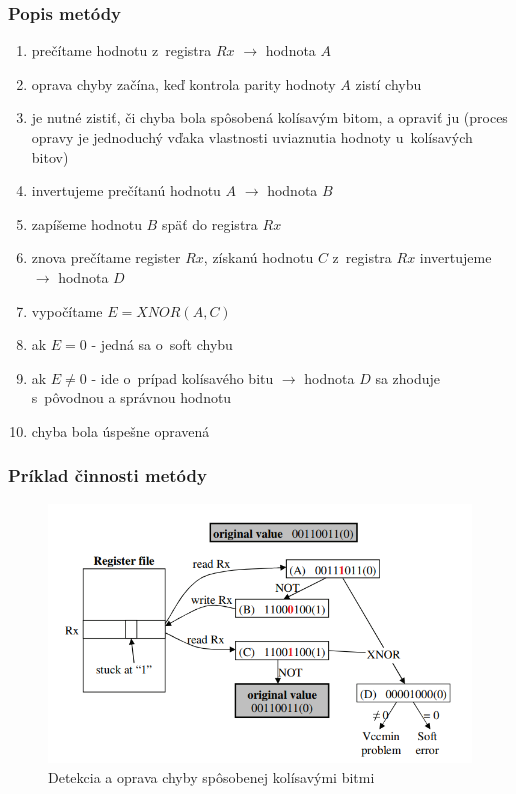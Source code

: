 \documentclass{beamer}
\begin{document}
\begin{frame}\frametitle{Popis metódy}
\begin{enumerate}
	\item prečítame hodnotu z~registra $Rx$ $\rightarrow$ hodnota $A$
	\item oprava chyby začína, keď kontrola parity hodnoty $A$ zistí chybu
	\item je nutné zistiť, či chyba bola spôsobená kolísavým bitom, a opraviť ju 	(proces opravy je jednoduchý vďaka vlastnosti uviaznutia hodnoty u~kolísavých bitov)
	\item invertujeme prečítanú hodnotu $A$ $\rightarrow$ hodnota $B$
	\item zapíšeme hodnotu $B$ späť do registra $Rx$
	\item znova prečítame register $Rx$, získanú hodnotu $C$  z~registra $Rx$ invertujeme $\rightarrow$ hodnota $D$
	\item vypočítame $E= XNOR(A,C)$
	\item ak $E = 0$ \-- jedná sa o~soft chybu
	\item ak $E \neq 0$ \--  ide o~prípad kolísavého bitu $\rightarrow$ hodnota $D$ sa zhoduje s~pôvodnou a správnou hodnotu
	\item chyba bola úspešne opravená
\end{enumerate}
\end{frame}

\begin{frame}\frametitle{Príklad činnosti metódy}
\begin{center}
	\begin{figure}
		\includegraphics[width=\textwidth,height=0.7\textheight,keepaspectratio]{example.png}
		\caption{Detekcia a oprava chyby spôsobenej kolísavými bitmi}
	\end{figure}
\end{center}
\end{frame}
\end{document}

